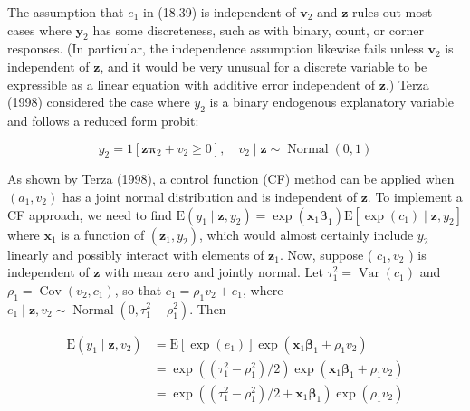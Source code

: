 \documentclass[10pt]{article}
\begin{document}
The assumption that $e_{1}$ in (18.39) is independent of $\mathbf{v}_{2}$ and $\mathbf{z}$ rules out most cases where $\mathbf{y}_{2}$ has some discreteness, such as with binary, count, or corner responses. (In particular, the independence assumption likewise fails unless $\mathbf{v}_{2}$ is independent of $\mathbf{z}$, and it would be very unusual for a discrete variable to be expressible as a linear equation with additive error independent of $\mathbf{z}$.) Terza (1998) considered the case where $y_{2}$ is a binary endogenous explanatory variable and follows a reduced form probit:


\begin{equation*}
y_{2}=1\left[\mathbf{z} \boldsymbol{\pi}_{2}+v_{2} \geq 0\right], \quad v_{2} \mid \mathbf{z} \sim \operatorname{Normal}(0,1) \tag{18.43}
\end{equation*}


As shown by Terza (1998), a control function (CF) method can be applied when $\left(a_{1}, v_{2}\right)$ has a joint normal distribution and is independent of $\mathbf{z}$. To implement a CF approach, we need to find $\mathrm{E}\left(y_{1} \mid \mathbf{z}, y_{2}\right)=\exp \left(\mathbf{x}_{1} \boldsymbol{\beta}_{1}\right) \mathrm{E}\left[\exp \left(c_{1}\right) \mid \mathbf{z}, y_{2}\right]$ where $\mathbf{x}_{1}$ is a function of $\left(\mathbf{z}_{1}, y_{2}\right)$, which would almost certainly include $y_{2}$ linearly and possibly interact with elements of $\mathbf{z}_{1}$. Now, suppose ( $c_{1}, v_{2}$ ) is independent of $\mathbf{z}$ with mean zero and jointly normal. Let $\tau_{1}^{2}=\operatorname{Var}\left(c_{1}\right)$ and $\rho_{1}=\operatorname{Cov}\left(v_{2}, c_{1}\right)$, so that $c_{1}=\rho_{1} v_{2}+e_{1}$, where $e_{1} \mid \mathbf{z}, v_{2} \sim \operatorname{Normal}\left(0, \tau_{1}^{2}-\rho_{1}^{2}\right)$. Then


\begin{align*}
\mathrm{E}\left(y_{1} \mid \mathbf{z}, v_{2}\right) & =\mathrm{E}\left[\exp \left(e_{1}\right)\right] \exp \left(\mathbf{x}_{1} \boldsymbol{\beta}_{1}+\rho_{1} v_{2}\right) \\
& =\exp \left(\left(\tau_{1}^{2}-\rho_{1}^{2}\right) / 2\right) \exp \left(\mathbf{x}_{1} \boldsymbol{\beta}_{1}+\rho_{1} v_{2}\right) \\
& =\exp \left(\left(\tau_{1}^{2}-\rho_{1}^{2}\right) / 2+\mathbf{x}_{1} \boldsymbol{\beta}_{1}\right) \exp \left(\rho_{1} v_{2}\right) \tag{18.44}
\end{align*}
\end{document}
